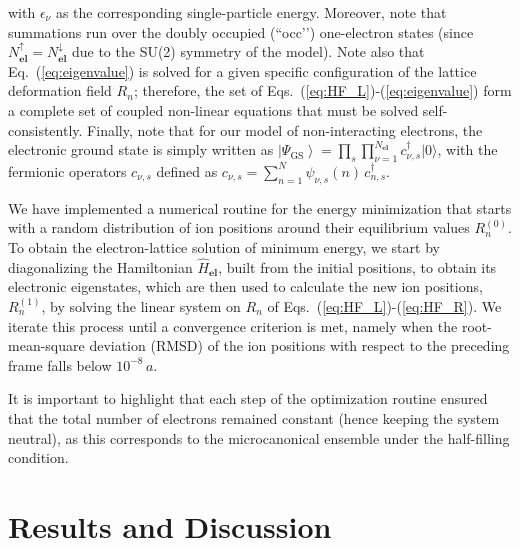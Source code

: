 \documentclass[10pt,a4paper]{article}
\begin{document}
%
with $\epsilon_{\nu}$ as the corresponding single-particle energy. Moreover, note that summations run over the doubly occupied (``occ’’) one-electron states (since $N_{\textbf{el}}^{\uparrow} = N_{\textbf{el}}^{\downarrow}$ due to the SU(2) symmetry of the model). Note also that Eq.~(\ref{eq:eigenvalue}) is solved for a given specific configuration of the lattice deformation field $R_{n}$; therefore, the set of Eqs.~(\ref{eq:HF_L})-(\ref{eq:eigenvalue}) form a complete set of coupled non-linear equations that must be solved self-consistently. Finally, note that for our model of non-interacting electrons, the electronic ground state is simply written as ${\left| \Psi_{\mathrm{GS}} \right\rangle = \prod_s \prod_{\nu=1}^{N_{\textbf{el}}} c_{\nu,s}^\dagger |0\rangle }$, with the fermionic operators $c_{\nu,s}$ defined as ${c_{\nu,s} = \sum_{n=1}^{N} \psi_{\nu,s}\left(n\right) \, c^\dagger_{n,s} }$.

We have implemented a numerical routine for the energy minimization that starts with a random distribution of ion positions around their equilibrium values $R_{n}^{(0)}$. To obtain the electron-lattice solution of minimum energy, we start by diagonalizing the Hamiltonian $\hat{H}_{\textbf{el}}$, built from the initial positions, to obtain its electronic eigenstates, which are then used to calculate the new ion positions, $R^{(1)}_{n}$, by solving the linear system on $R_n$ of Eqs.~(\ref{eq:HF_L})-(\ref{eq:HF_R}). We iterate this process until a convergence criterion is met, namely when the root-mean-square deviation (RMSD) of the ion positions with respect to the preceding frame falls below $10^{-8} \, a$.

It is important to highlight that each step of the optimization routine ensured that the total number of electrons remained constant (hence keeping the system neutral), as this corresponds to the microcanonical ensemble under the half-filling condition.

\section{Results and Discussion}\label{sec:results}
\end{document}

